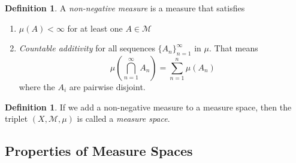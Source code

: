 \documentclass[12pt]{article}
\theoremstyle{plain}
\theoremstyle{definition}
\newtheorem{defn}[thm]{Definition}
\theoremstyle{remark}
\begin{document}
\begin{defn} 
A \emph{non-negative measure} is a measure that satisfies 
\begin{enumerate}
    \item $\mu(A)<\infty$ for at least one $A\in\mathscr{M}$ 
    \item \emph{Countable additivity} for all sequences $\{A_n\}_{n=1}^\infty$ in $\mu$. That means 
        \[
            \mu\left(\bigcap^\infty_{n=1}A_n\right) 
            = \sum^n_{n=1} \mu(A_n)
        \]
        where the $A_i$ are pairwise disjoint.
\end{enumerate}
\end{defn}

\begin{defn} 
If we add a non-negative measure to a measure space, then the triplet $(X,\mathscr{M},\mu)$ is called a \emph{measure space}. 
\end{defn}

\subsection{Properties of Measure Spaces}
\end{document}
